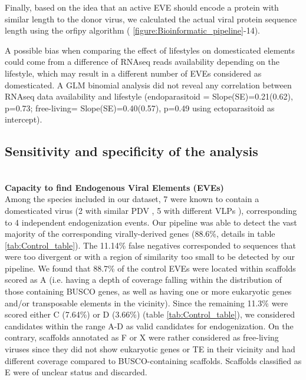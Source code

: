 Finally, based on the idea that an active EVE should encode a protein with similar length to the donor virus, we calculated the actual viral protein sequence length using the orfipy algorithm \citep{singh_orfipy_2021} (\figurename{ \ref{figure:Bioinformatic_pipeline}}-14).  

A possible bias when comparing the effect of lifestyles on domesticated elements could come from a difference of RNAseq reads availability depending on the lifestyle, which may result in a different number of EVEs considered as domesticated. A GLM binomial analysis did not reveal any correlation between RNAseq data availability and lifestyle (endoparasitoid = Slope(SE)=0.21(0.62), p=0.73; free-living= Slope(SE)=0.40(0.57), p=0.49 using ectoparasitoid as intercept).

\subsection{Sensitivity and specificity of the analysis}
\label{sec:MM-8}

\textbf{\\Capacity to find Endogenous Viral Elements (EVEs)}
\\Among the species included in our dataset, 7 were known to contain a domesticated virus (2 with similar PDV \citep{bezier_polydnaviruses_2009-1}, 5 with different VLPs \citep{pichon_recurrent_2015,burke_common_2019,di_giovanni_behavior-manipulating_2020}), corresponding to 4 independent endogenization events.  Our pipeline was able to detect the vast majority of the corresponding virally-derived genes (88.6\%, details in table \ref{tab:Control_table}). The 11.14\% false negatives corresponded to sequences that were too divergent or with a region of similarity too small to be detected by our pipeline. We found that 88.7\% of the control EVEs were located within scaffolds scored as A (i.e. having a depth of coverage falling within the distribution of those containing BUSCO genes, as well as having one or more eukaryotic genes and/or transposable elements in the vicinity). Since the remaining 11.3\% were scored either C (7.64\%) or D (3.66\%) (table \ref{tab:Control_table}), we considered candidates within the range A-D as valid candidates for endogenization. On the contrary, scaffolds annotated as F or X were rather considered as free-living viruses since they did not show eukaryotic genes or TE in their vicinity and had different coverage compared to BUSCO-containing scaffolds. Scaffolds classified as E were of unclear status and discarded.

